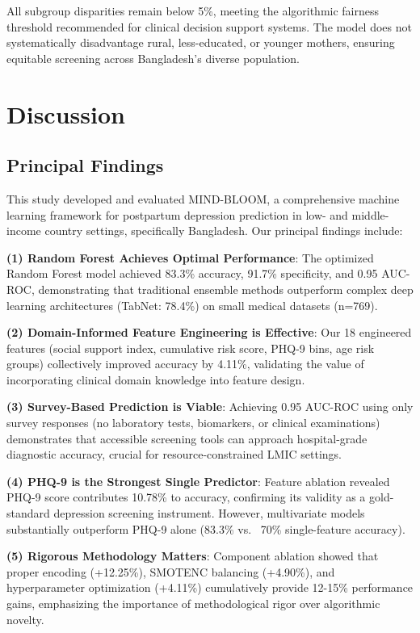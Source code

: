 All subgroup disparities remain below 5\%, meeting the algorithmic fairness threshold recommended for clinical decision support systems. The model does not systematically disadvantage rural, less-educated, or younger mothers, ensuring equitable screening across Bangladesh's diverse population.

\section{Discussion}

\subsection{Principal Findings}

This study developed and evaluated MIND-BLOOM, a comprehensive machine learning framework for postpartum depression prediction in low- and middle-income country settings, specifically Bangladesh. Our principal findings include:

\textbf{(1) Random Forest Achieves Optimal Performance}: The optimized Random Forest model achieved 83.3\% accuracy, 91.7\% specificity, and 0.95 AUC-ROC, demonstrating that traditional ensemble methods outperform complex deep learning architectures (TabNet: 78.4\%) on small medical datasets (n=769).

\textbf{(2) Domain-Informed Feature Engineering is Effective}: Our 18 engineered features (social support index, cumulative risk score, PHQ-9 bins, age risk groups) collectively improved accuracy by 4.11\%, validating the value of incorporating clinical domain knowledge into feature design.

\textbf{(3) Survey-Based Prediction is Viable}: Achieving 0.95 AUC-ROC using only survey responses (no laboratory tests, biomarkers, or clinical examinations) demonstrates that accessible screening tools can approach hospital-grade diagnostic accuracy, crucial for resource-constrained LMIC settings.

\textbf{(4) PHQ-9 is the Strongest Single Predictor}: Feature ablation revealed PHQ-9 score contributes 10.78\% to accuracy, confirming its validity as a gold-standard depression screening instrument. However, multivariate models substantially outperform PHQ-9 alone (83.3\% vs. ~70\% single-feature accuracy).

\textbf{(5) Rigorous Methodology Matters}: Component ablation showed that proper encoding (+12.25\%), SMOTENC balancing (+4.90\%), and hyperparameter optimization (+4.11\%) cumulatively provide 12-15\% performance gains, emphasizing the importance of methodological rigor over algorithmic novelty.


